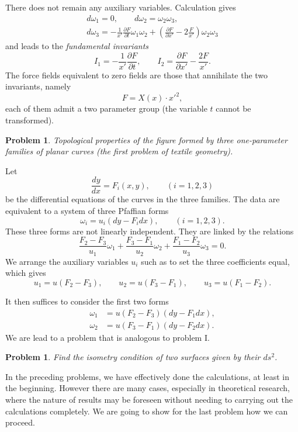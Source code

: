 \documentclass[leqno,11pt]{article}
\newcommand{\pd}{\partial}
\theoremstyle{shape1}
\newtheorem{prob}[thm]{Problem}
\theoremstyle{shape0}
\theoremstyle{shape2}
\theoremstyle{definition}
\begin{document}
There does not remain any auxiliary variables. Calculation gives
\begin{gather*}
  d\omega_{1}=0,\qquad d\omega_{2}=\omega_{2}\omega_{3},\\
  d\omega_{3}=-\frac{1}{x'}\frac{\pd F}{\pd t}\omega_{1}\omega_{2}+\left(\frac{\pd F}{\pd x'}-2\frac{F}{x'}\right)\omega_{2}\omega_{3}
\end{gather*}
and leads to the \emph{fundamental invariants}
\[
I_{1}=-\frac{1}{x'}\frac{\pd F}{\pd t},\qquad I_{2}=\frac{\pd F}{\pd x'}-\frac{2F}{x'}.
\]
The force fields equivalent to zero fields are those that annihilate the two invariants, namely
\[
F=X(x)\cdot x'^{2},
\]
each of them admit a two parameter group (the variable $t$ cannot be transformed).

\begin{prob}
  Topological properties of the figure formed by three one-parameter families of planar curves \emph{(the first problem of textile geometry).}
\end{prob}

Let
\[
\frac{dy}{dx}=F_{i}(x,y),\qquad(i=1,2,3)
\]
be the differential equations of the curves in the three families. The data are equivalent to a system of three Pfaffian forms
\[
\omega_{i}=u_{i}(dy-F_{i}dx),\qquad (i=1,2,3).
\]
These three forms are not linearly independent. They are linked by the relations
\[
\frac{F_{2}-F_{3}}{u_{1}}\omega_{1}+
\frac{F_{3}-F_{1}}{u_{2}}\omega_{2}+
\frac{F_{1}-F_{2}}{u_{3}}\omega_{3}=0.
\]
We arrange the auxiliary variables $u_{i}$ such as to set the three coefficients equal, which gives
\[
u_{1}=u(F_{2}-F_{3}),\qquad u_{2}=u(F_{3}-F_{1}),\qquad u_{3}=u(F_{1}-F_{2}).
\]

It then suffices to consider the first two forms
\begin{align*}
  \omega_{1}&=u(F_{2}-F_{3})(dy-F_{1}dx),\\
  \omega_{2}&=u(F_{3}-F_{1})(dy-F_{2}dx).
\end{align*}
We are lead to a problem that is analogous to problem I.


\begin{prob}
  Find the isometry condition of two surfaces given by their $ds^{2}$.
\end{prob}

In the preceding problems, we have effectively done the calculations, at least in the beginning. However there are many cases, especially in theoretical research, where the nature of results may be foreseen without needing to carrying out the calculations completely. We are going to show for the last problem how we can proceed.
\end{document}

